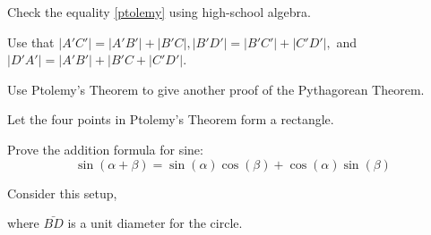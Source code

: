 \documentclass[newpage,hints,handout]{ximera}
\begin{document}
\begin{problem}
Check the equality \eqref{ptolemy} using high-school algebra.

\begin{hint}
 Use that $|A'C'|=|A'B'|+|B'C|, |B'D'|=|B'C'|+|C'D'|,$ and $|D'A'|=|A'B'|+|B'C+|C'D'|$. 
\end{hint}
\begin{freeResponse}
\end{freeResponse}
\end{problem}

\begin{problem}
Use Ptolemy's Theorem to give another proof of the Pythagorean Theorem.
\begin{hint}
Let the four points in Ptolemy's Theorem form a rectangle.
\end{hint}
\begin{freeResponse}
\end{freeResponse}
\end{problem}


\begin{problem}
Prove the addition formula for sine:
\[
\sin(\alpha + \beta) = \sin(\alpha)\cos(\beta) +
\cos(\alpha)\sin(\beta)
\]
\begin{hint}
Consider this setup, 
\begin{image}
\end{image}
where $\bar{BD}$ is a unit diameter for the circle.
\end{hint}
\end{problem}
\end{document}
